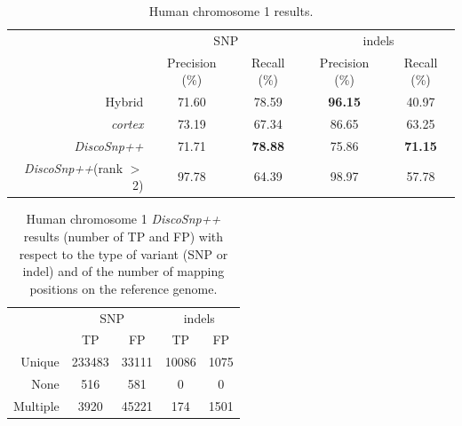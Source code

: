 \documentclass{bmcart}
\newcommand{\discopp}{{\it DiscoSnp++}\xspace}
\newcommand{\co}{{\it cortex}\xspace}
\begin{document}
\begin{backmatter}
	

\begin{table}[h!]
	\caption{Human chromosome 1 results.  \label{tab:humanresults} }
	\begin{tabular}{r|cc|cc}
		 & \multicolumn{2}{c|}{SNP} & \multicolumn{2}{c}{indels}\\
		 & Precision (\%) & Recall (\%) & Precision (\%) & Recall (\%) \\\hline
		 Hybrid & 71.60 & 78.59 & \textbf{96.15} & 40.97\\
		 \co& {73.19} & 67.34 & 86.65 & 63.25 \\
		 \discopp& 71.71 & \textbf{78.88} & 75.86 & \textbf{71.15} \\\hline
		 \discopp (rank $>$ 2)& 97.78 & 64.39 & 98.97 & 57.78 
	\end{tabular}
	\end{table}
       
       
	

\begin{table}[h!]
	\caption{Human chromosome 1 \discopp results (number of TP and FP) with respect to the type of variant (SNP or indel) and of the number of mapping positions on the reference genome.  \label{tab:multipleSingle} }
	\begin{tabular}{r|cc|cc}
               & \multicolumn{2}{c|}{SNP} & \multicolumn{2}{c}{indels}\\
               &TP&FP&TP&FP\\\hline
               Unique&      233483&       33111& 10086&1075\\
               None&        516&          581& 0&0\\
               Multiple&    3920&         45221&174&1501
	\end{tabular}
	\end{table}



\end{backmatter}
\end{document}

